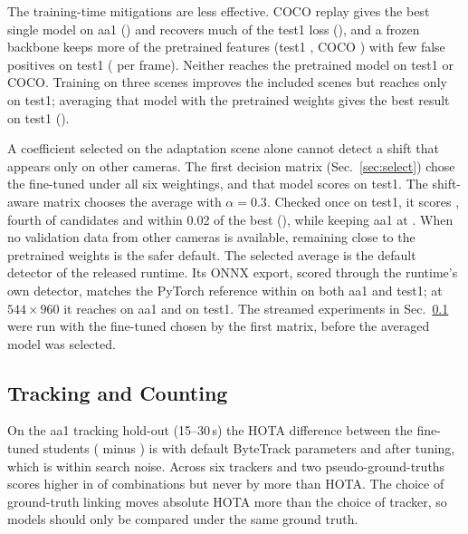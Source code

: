 The training-time mitigations are less effective. COCO replay gives the best single model on aa1 (\MsRepAa) and recovers much
of the test1 loss (\MsRepHo), and a frozen backbone keeps more of the pretrained features (test1 \MsFrzHo, COCO
\MsFrzCoco) with few false positives on test1 (\MsFrzHoFppi{} per frame). Neither reaches the pretrained model on test1 or COCO. Training
on three scenes improves the included scenes but reaches only \MsMultiHo{} on test1; averaging that model with
the pretrained weights gives the best \yolo{} result on test1 (\MsWiMuHo).

A coefficient selected on the adaptation scene alone cannot detect a shift that appears only on other cameras. The first decision
matrix (Sec.~\ref{sec:select}) chose the fine-tuned \yolo{} under all six weightings, and that model scores \SrOrigHo{}
on test1. The shift-aware matrix chooses the average with $\alpha{=}0.3$. Checked once on test1, it scores \SrWinnerHo,
fourth of \SrN{} candidates and within 0.02 of the best (\MsWiFtHo), while keeping aa1 \AP{} at
\MsSelAa. When no validation data from other cameras is available, remaining close to the pretrained weights is the
safer default. The selected average is the default detector of the released runtime. Its ONNX export, scored through
the runtime's own detector, matches the PyTorch reference within \SxParity{} \AP{} on both aa1 and test1; at
$544{\times}960$ it reaches \SxAaMid{} on aa1 and \SxHoMid{} on test1. The streamed experiments in
Sec.~\ref{sec:tracking} were run with the fine-tuned \yolo{} chosen by the first matrix, before the averaged model
was selected.

\subsection{Tracking and Counting}
\label{sec:tracking}
On the aa1 tracking hold-out (15--30\,s) the HOTA difference between the fine-tuned students (\yolo{} minus \rfdetr{}) is
\BtDefGap{} with default ByteTrack parameters and \BtTunGap{} after tuning, which is within search noise. Across six trackers and two
pseudo-ground-truths \yolo{} scores higher in \TcWinsAll{} of \TcPairs{} combinations but never by more than \TcMaxGap{} HOTA.
The choice of ground-truth linking moves absolute HOTA more than the choice of tracker, so models should only be
compared under the same ground truth.

